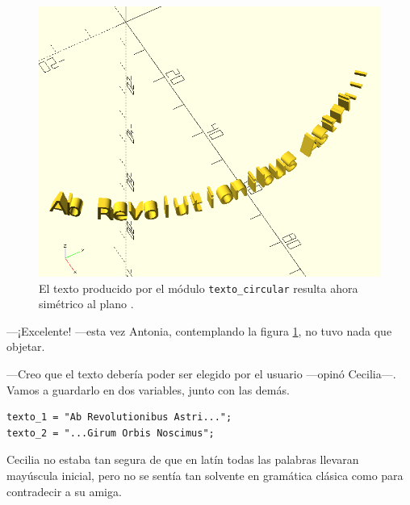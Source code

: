\begin{figure}[ht]
  \centering
  \includegraphics[width=.6\textwidth]{imagenes/texto-circular-6}  
  \caption{El texto producido por el módulo \lstinline!texto_circular!
    resulta ahora simétrico al plano .}
  \label{fig:texto-circular-6}
\end{figure}




---¡Excelente! ---esta vez Antonia, contemplando la figura
\ref{fig:texto-circular-6}, no tuvo nada que ob\-je\-tar.

---Creo que el texto debería poder ser elegido por el usuario ---opinó
Cecilia---. Vamos a guardarlo en dos variables, junto con las demás.

\begin{lstlisting}
texto_1 = "Ab Revolutionibus Astri...";
texto_2 = "...Girum Orbis Noscimus";
\end{lstlisting}

Cecilia no estaba tan segura de que en latín todas las palabras
llevaran mayúscula inicial, pero no se sentía tan solvente en
gramática clásica como para contradecir a su amiga.%


